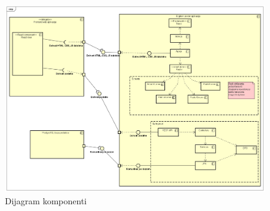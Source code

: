 			 \begin{figure}[H]
			 	\includegraphics[width=\textwidth]{slike/dijagramKomponenti.PNG} %
			 	\caption{Dijagram komponenti}
			 	\label{fig:dijagramKomponenti} %
			 \end{figure}
			 